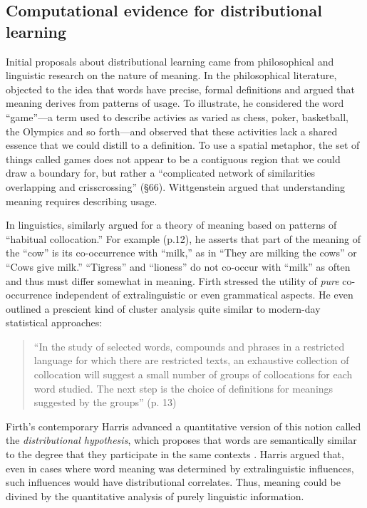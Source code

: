 \documentclass[man,longtable, floatmark]{my-apa6}
\begin{document}
\subsection{Computational evidence for distributional learning}

Initial proposals about distributional learning came from philosophical and linguistic research on the nature of meaning. In the philosophical literature, \citet{wittgenstein1953} objected to the idea that words have precise, formal definitions and argued that meaning derives from patterns of usage. To illustrate, he considered the word ``game''---a term used to describe activies as varied as chess, poker, basketball, the Olympics and so forth---and observed that these activities lack a shared essence that we could distill to a definition. To use a spatial metaphor, the set of things called games does not appear to be a contiguous region that we could draw a boundary for, but rather a ``complicated network of similarities overlapping and crisscrossing'' (\S 66). Wittgenstein argued that understanding meaning requires describing usage.

In linguistics, \citet{firth1957} similarly argued for a theory of meaning based on patterns of ``habitual collocation.'' For example (p.12), he asserts that part of the meaning of the ``cow'' is its co-occurrence with  ``milk,'' as in ``They are milking the cows'' or ``Cows give milk.'' ``Tigress'' and ``lioness'' do not co-occur with ``milk'' as often and thus must differ somewhat in meaning. Firth stressed the utility of \emph{pure} co-occurrence independent of extralinguistic or even grammatical aspects. He even outlined a prescient kind of cluster analysis quite similar to modern-day statistical approaches:

\begin{quote}
``In the study of selected words, compounds and phrases in a restricted language for which there are restricted texts, an exhaustive collection of collocation will suggest a small number of groups of collocations for each word studied. The next step is the choice of definitions for meanings suggested by the groups'' (p. 13)
\end{quote}

Firth's contemporary Harris advanced a quantitative version of this notion called the \emph{distributional hypothesis}, which proposes that words are semantically similar to the degree that they participate in the same contexts \citep{harris1951}. Harris argued that, even in cases where word meaning was determined by extralinguistic influences, such influences would have distributional correlates. Thus, meaning could be divined by the quantitative analysis of purely linguistic information.
\end{document}
